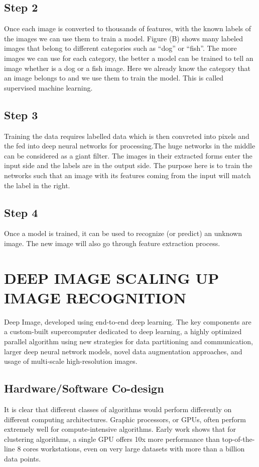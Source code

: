 \documentclass[12pt,letterpaper, onecolumn]{exam}
\begin{document}
    \subsection{Step 2}
        Once each image is converted to thousands of features, with the known labels of the images we can use them to train a model. Figure (B) shows many labeled images that belong to different categories such as “dog” or “fish”. The more images we can use for each category, the better a model can be trained to tell an image whether is a dog or a fish image. Here we already know the category that an image belongs to and we use them to train the model. This is called supervised machine learning.
    \subsection{Step 3}
        Training the data requires labelled data which is then convreted into pixels and the fed into deep neural networks for processing.The huge networks in the middle can be considered as a giant filter. The images in their extracted forms enter the input side and the labels are in the output side. The purpose here is to train the networks such that an image with its features coming from the input will match the label in the right.
    
    \subsection{Step 4}
    Once a model is trained, it can be used to recognize (or predict) an unknown image.
    The new image will also go through feature extraction process.
    
\section{DEEP IMAGE SCALING UP IMAGE RECOGNITION }
    Deep Image, developed using end-to-end deep learning. The key components are a custom-built supercomputer dedicated to deep learning, a highly optimized parallel algorithm using new strategies for data partitioning and communication, larger deep neural network models, novel data augmentation approaches, and usage of multi-scale high-resolution images.
    
    \subsection{Hardware/Software Co-design }
    It is clear that different classes of algorithms would perform differently on different computing architectures. Graphic processors, or GPUs, often perform extremely well for compute-intensive algorithms. Early work shows that for clustering algorithms, a single GPU offers 10x more performance than top-of-the-line 8 cores workstations, even on very large datasets with more than a billion data points. 
    
\end{document}

